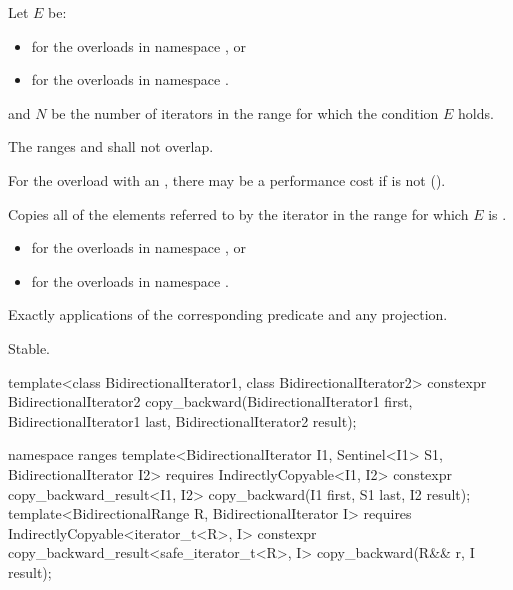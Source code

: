 \begin{itemdescr}
\pnum
Let $E$ be:
\begin{itemize}
\item
  for the overloads in namespace , or
\item
  for the overloads in namespace .
\end{itemize}
and $N$ be the number of iterators  in the range 
for which the condition $E$ holds.

\pnum
\requires
The ranges  and 
shall not overlap.
\begin{note}
For the overload with an ,
there may be a performance cost
if 
is not  ().
\end{note}

\pnum
\effects
Copies all of the elements referred to
by the iterator  in the range 
for which $E$ is .

\pnum
\returns
\begin{itemize}
\item
  for the overloads in namespace , or
\item
  for the overloads in namespace .
\end{itemize}

\pnum
\complexity
Exactly  applications
of the corresponding predicate and any projection.

\pnum
\remarks
Stable.
\end{itemdescr}

%
\begin{itemdecl}
template<class BidirectionalIterator1, class BidirectionalIterator2>
  constexpr BidirectionalIterator2
    copy_backward(BidirectionalIterator1 first,
                  BidirectionalIterator1 last,
                  BidirectionalIterator2 result);

namespace ranges {
  template<BidirectionalIterator I1, Sentinel<I1> S1, BidirectionalIterator I2>
    requires IndirectlyCopyable<I1, I2>
    constexpr copy_backward_result<I1, I2>
      copy_backward(I1 first, S1 last, I2 result);
  template<BidirectionalRange R, BidirectionalIterator I>
    requires IndirectlyCopyable<iterator_t<R>, I>
    constexpr copy_backward_result<safe_iterator_t<R>, I>
      copy_backward(R&& r, I result);
}
\end{itemdecl}

